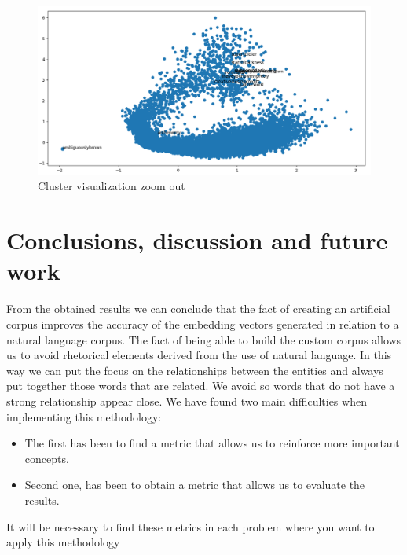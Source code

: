 \documentclass[letterpaper]{article}
\begin{document}
	\begin{figure}
		\centering
		\includegraphics[width=1\linewidth]{../images/cluster-36-visualization-new-corpus-v3-1024-ironman3-zoom-out.png}
		\caption{Cluster visualization zoom out}
		\label{fig:cluster-visualization-zoom-out}
	\end{figure}
	
	
	
	\section{Conclusions, discussion and future work}
	 
	From the obtained results we can conclude that the fact of creating an artificial corpus improves the accuracy of the embedding vectors generated in relation to a natural language  corpus. The fact of being able to build the custom corpus allows us to avoid rhetorical elements derived from the use of natural language. In this way we can put the focus on the relationships between the entities and always put together those words that are related. We avoid so words that do not have a strong relationship appear close. 
	We have found two main difficulties when implementing this methodology:
	\begin{itemize}
	\item The first has been to find a metric that allows us to reinforce more important concepts. 
	\item Second one, has been to obtain a metric that allows us to evaluate the results.
    \end{itemize}
	It will be necessary to find these metrics in each problem where you want to apply this methodology
	
\end{document}
